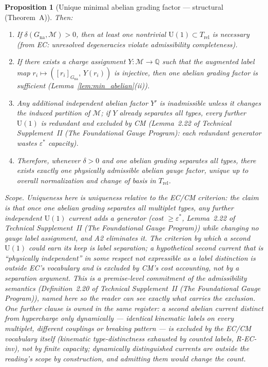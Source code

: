 \documentclass[11pt]{article}
\newtheorem{proposition}[theorem]{Proposition}
\theoremstyle{definition}
\newcommand{\U}{\mathrm{U}}
\newcommand{\TSII}{Technical Supplement~II (\emph{The Foundational Gauge Program})}
\begin{document}
\begin{proposition}[Unique minimal abelian grading factor ---
structural (Theorem~A)]
Then:
\begin{enumerate}[label=(\roman*),nosep]
  \item If $\delta(G_{\mathrm{na}}, \mathcal{M}) > 0$, then at
  least one nontrivial $\U(1) \subset T_{\mathrm{rel}}$ is necessary
  (from EC: unresolved degeneracies violate admissibility completeness).
  \item If there exists a charge assignment $Y: \mathcal{M} \to \mathbb{Q}$
  such that the augmented label map
  $r_i \mapsto ([r_i]_{G_{\mathrm{na}}},\, Y(r_i))$
  is injective, then one abelian grading factor is sufficient
  (Lemma~\ref{lem:min_abelian}(ii)).
  \item Any additional independent abelian
  factor $Y'$ is inadmissible unless it changes the induced partition of
  $\mathcal{M}$; if $Y$ already separates all types, every further
  $\U(1)$ is redundant and excluded by CM
  (Lemma~2.22 of \TSII{}: each redundant generator wastes
  $\varepsilon^*$ capacity).
  \item Therefore, whenever $\delta > 0$ and one abelian grading
  separates all types, there exists exactly one physically admissible
  abelian gauge factor, unique up to overall normalization and change
  of basis in $T_{\mathrm{rel}}$.
\end{enumerate}
\emph{Scope.}  Uniqueness here is uniqueness \emph{relative to the
EC/CM criterion}: the claim is that once one abelian grading separates
all multiplet types, any further independent $\U(1)$ current adds a
generator (cost $\ge \varepsilon^*$, Lemma~2.22 of \TSII{})
while changing no gauge label assignment, and A2 eliminates it.  The
criterion by which a second $\U(1)$ could earn its keep is label
separation; a hypothetical second current that is ``physically
independent'' in some respect not expressible as a label distinction
is outside EC's vocabulary and is excluded by CM's cost accounting,
not by a separation argument.  This is a premise-level commitment of
the admissibility semantics (Definition~2.20 of \TSII{}),
named here so the reader can see exactly what carries the exclusion.
One further clause is owned in the same register: a second abelian
current distinct from hypercharge only \emph{dynamically} --- identical
kinematic labels on every multiplet, different couplings or breaking
pattern --- is excluded by the EC/CM vocabulary itself (kinematic
type-distinctness exhausted by counted labels, R-EC-inv), not by
finite capacity; dynamically distinguished currents are outside the
reading's scope by construction, and admitting them would change the
count.
\end{proposition}
\end{document}
